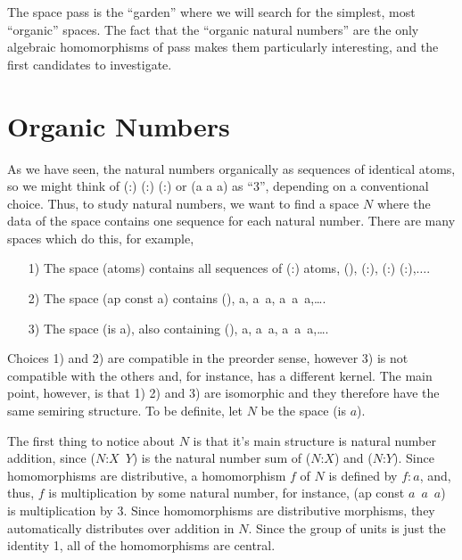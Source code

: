 \documentclass[11pt]{article}
\begin{document}
The space pass is the ``garden'' where we will search for the simplest, most ``organic'' spaces.  
The fact that the ``organic natural numbers'' are the only algebraic homomorphisms of pass makes them particularly interesting, and the first candidates to investigate.

\section{Organic Numbers}

      As we have seen, the natural numbers organically as sequences of identical atoms, so we might think of (:) (:) (:) or (a a a) as ``3'', depending on a conventional choice.  
Thus, to study natural numbers, we want to find a space $N$ where the data of the space contains one sequence for each natural number.  There are many 
spaces which do this, for example,  
\begin{itemize}
\item [1)] The space (atoms) contains all sequences of (:) atoms, (), (:), (:) (:),$\dots$. 
\item [2)] The space (ap const a) contains (), a, a\ a, a\ a\ a,\dots. 
\item [3)] The space (is a), also containing (), a, a\ a, a\ a\ a,\dots.
\end{itemize}
Choices 1) and 2) are compatible in the preorder sense, however 3) is not compatible with the others and, for instance, has a different kernel.  
The main point, however, is that 1) 2) and 3) are isomorphic and they therefore have the same semiring structure.  To be definite, let $N$ be the space (is $a$).  
     
     The first thing to notice about $N$ is that it's main structure is natural number addition, since ($N$:$X$\ $Y$) is the natural number sum of ($N$:$X$) and ($N$:$Y$).  
Since homomorphisms are distributive, a homomorphism $f$ of $N$ is defined by $f:a$, and, thus, $f$ is multiplication by some natural number, 
for instance, (ap const $a$\ $a$\ $a$) is multiplication by $3$.  Since homomorphisms are distributive morphisms, they automatically distributes over addition in $N$.  
Since the group of units is just the identity 1, all of the homomorphisms are central.  
     
\end{document}
